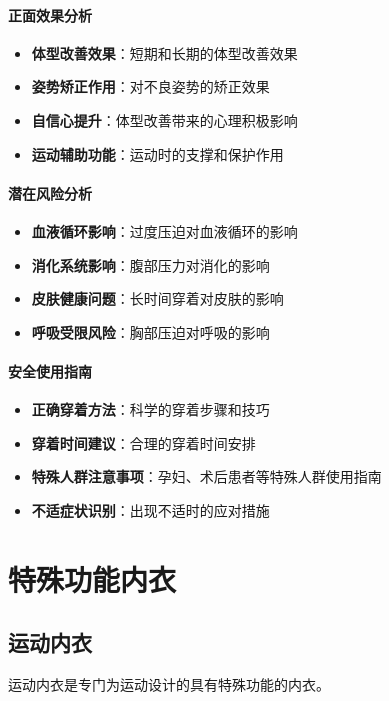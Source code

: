 \documentclass[12pt,UTF8]{ctexbook}
\begin{document}
\subsubsection{正面效果分析}
\begin{itemize}[leftmargin=2cm]
	\item \textbf{体型改善效果}：短期和长期的体型改善效果
	\item \textbf{姿势矫正作用}：对不良姿势的矫正效果
	\item \textbf{自信心提升}：体型改善带来的心理积极影响
	\item \textbf{运动辅助功能}：运动时的支撑和保护作用
\end{itemize}

\subsubsection{潜在风险分析}
\begin{itemize}[leftmargin=2cm]
	\item \textbf{血液循环影响}：过度压迫对血液循环的影响
	\item \textbf{消化系统影响}：腹部压力对消化的影响
	\item \textbf{皮肤健康问题}：长时间穿着对皮肤的影响
	\item \textbf{呼吸受限风险}：胸部压迫对呼吸的影响
\end{itemize}

\subsubsection{安全使用指南}
\begin{itemize}[leftmargin=2cm]
	\item \textbf{正确穿着方法}：科学的穿着步骤和技巧
	\item \textbf{穿着时间建议}：合理的穿着时间安排
	\item \textbf{特殊人群注意事项}：孕妇、术后患者等特殊人群使用指南
	\item \textbf{不适症状识别}：出现不适时的应对措施
\end{itemize}

\chapter{特殊功能内衣}
\section{运动内衣}
运动内衣是专门为运动设计的具有特殊功能的内衣。
\end{document}
